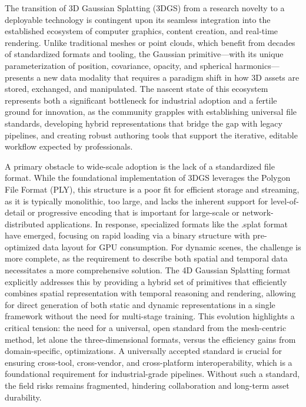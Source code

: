 \documentclass[11pt,a4paper]{article}
\begin{document}
The transition of 3D Gaussian Splatting (3DGS) from a research novelty to a deployable technology is contingent upon its seamless integration into the established ecosystem of computer graphics, content creation, and real-time rendering. Unlike traditional meshes or point clouds, which benefit from decades of standardized formats and tooling, the Gaussian primitive---with its unique parameterization of position, covariance, opacity, and spherical harmonics---presents a new data modality that requires a paradigm shift in how 3D assets are stored, exchanged, and manipulated. The nascent state of this ecosystem represents both a significant bottleneck for industrial adoption and a fertile ground for innovation, as the community grapples with establishing universal file standards, developing hybrid representations that bridge the gap with legacy pipelines, and creating robust authoring tools that support the iterative, editable workflow expected by professionals.

A primary obstacle to wide-scale adoption is the lack of a standardized file format. While the foundational implementation of 3DGS leverages the Polygon File Format (PLY), this structure is a poor fit for efficient storage and streaming, as it is typically monolithic, too large, and lacks the inherent support for level-of-detail or progressive encoding that is important for large-scale or network-distributed applications. In response, specialized formats like the .splat format have emerged, focusing on rapid loading via a binary structure with pre-optimized data layout for GPU consumption. For dynamic scenes, the challenge is more complete, as the requirement to describe both spatial and temporal data necessitates a more comprehensive solution. The 4D Gaussian Splatting format explicitly addresses this by providing a hybrid set of primitives that efficiently combines spatial representation with temporal reasoning and rendering, allowing for direct generation of both static and dynamic representations in a single framework without the need for multi-stage training. This evolution highlights a critical tension: the need for a universal, open standard from the mesh-centric method, let alone the three-dimensional formats, versus the efficiency gains from domain-specific, optimizations. A universally accepted standard is crucial for ensuring cross-tool, cross-vendor, and cross-platform interoperability, which is a foundational requirement for industrial-grade pipelines. Without such a standard, the field risks remains fragmented, hindering collaboration and long-term asset durability.
\end{document}
